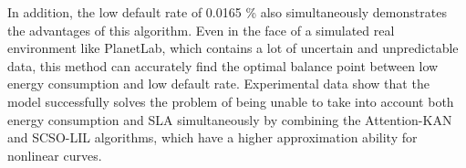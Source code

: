 \documentclass[conference]{{IEEEtran}}
\begin{document}
In addition, the low default rate of 0.0165 \% also simultaneously demonstrates the advantages of this algorithm. Even in the face of a simulated real environment like PlanetLab, which contains a lot of uncertain and unpredictable data, this method can accurately find the optimal balance point between low energy consumption and low default rate. Experimental data show that the  model successfully solves the problem of being unable to take into account both energy consumption and SLA simultaneously by combining the Attention-KAN and SCSO-LIL algorithms, which have a higher approximation ability for nonlinear curves.
%
%



%
%
\end{document}
